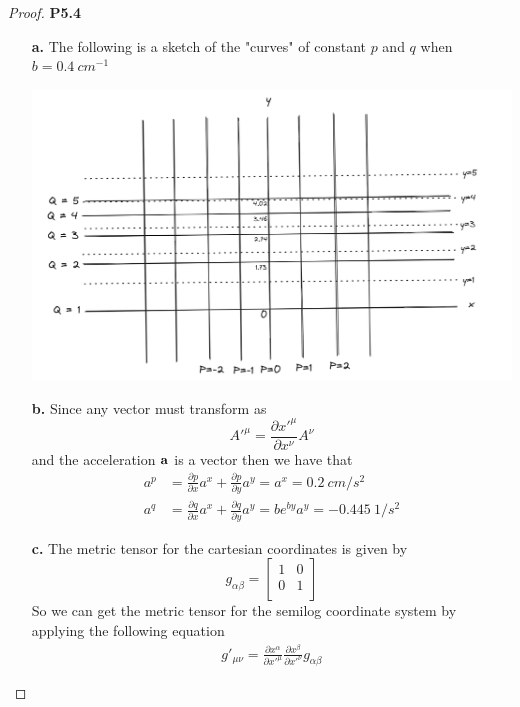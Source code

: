 \documentclass[11pt]{article}
\theoremstyle{definition}
\begin{document}
\begin{proof}{\textbf{P5.4}}
    \begin{itemize}
        \item[\bf{a.}] The following is a sketch of the "curves" of constant
        $p$ and $q$ when $b = 0.4~cm^{-1}$
        \begin{center}
            \includegraphics*[scale=0.3]{ch5_p5.4.png}
        \end{center}
        \item[\bf{b.}] Since any vector must transform as
        $$A'^\mu = \frac{\partial x'^\mu}{\partial x^\nu} A^\nu$$
        and the acceleration $\bf{a}$ is a vector then we have that
        \begin{align*}
            a^p &= \frac{\partial p}{\partial x}a^x
            + \frac{\partial p}{\partial y}a^y
            = a^x = 0.2~cm/s^2\\
            a^q &= \frac{\partial q}{\partial x}a^x
            + \frac{\partial q}{\partial y}a^y
            = be^{by}a^y = -0.445~1/s^2
        \end{align*}
        \item[\bf{c.}] The metric tensor for the cartesian coordinates is given by
        $$g_{\alpha\beta} = \begin{bmatrix}
            1 & 0\\
            0 & 1\\
        \end{bmatrix}$$
        So we can get the metric tensor for the semilog coordinate system
        by applying the following equation
        \begin{align*}
            g'_{\mu\nu} = \frac{\partial x^\alpha}{\partial x'^\mu}
            \frac{\partial x^\beta}{\partial x'^\nu} g_{\alpha\beta}

\end{align*}
\end{itemize}
\end{proof}
\end{document}
